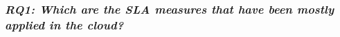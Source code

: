 
 
\subsubsection{\textit{RQ1: Which are the SLA measures that have been mostly applied  in the cloud?}}
